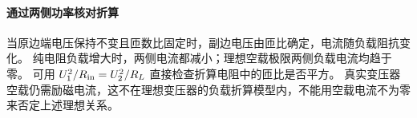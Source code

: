 
\paragraph{通过两侧功率核对折算}
当原边端电压保持不变且匝数比固定时，副边电压由匝比确定，电流随负载阻抗变化。
纯电阻负载增大时，两侧电流都减小；理想空载极限两侧负载电流均趋于零。
可用 $U_1^2/R_{\rm in}=U_2^2/R_L$ 直接检查折算电阻中的匝比是否平方。
真实变压器空载仍需励磁电流，这不在理想变压器的负载折算模型内，不能用空载电流不为零来否定上述理想关系。



